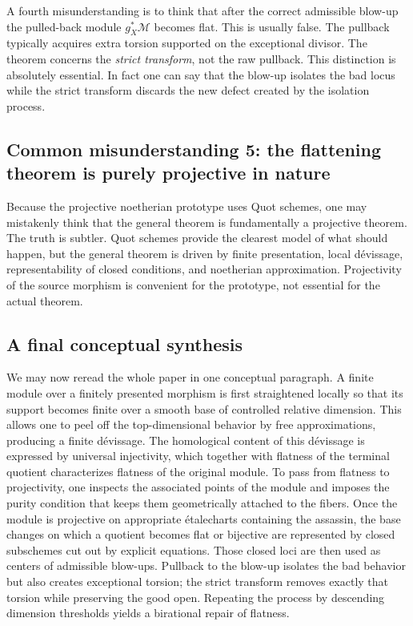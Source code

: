 \documentclass[11pt,oneside]{article}
\newcommand{\M}{\mathcal M}
\newcommand{\etale}{\'etale}
\begin{document}
A fourth misunderstanding is to think that after the correct admissible blow-up the pulled-back module $g_X^*\M$ becomes flat.  This is usually false.  The pullback typically acquires extra torsion supported on the exceptional divisor.  The theorem concerns the \emph{strict transform}, not the raw pullback.  This distinction is absolutely essential.  In fact one can say that the blow-up isolates the bad locus while the strict transform discards the new defect created by the isolation process.

\subsection*{Common misunderstanding 5: the flattening theorem is purely projective in nature}

Because the projective noetherian prototype uses Quot schemes, one may mistakenly think that the general theorem is fundamentally a projective theorem.  The truth is subtler.  Quot schemes provide the clearest model of what should happen, but the general theorem is driven by finite presentation, local d\'evissage, representability of closed conditions, and noetherian approximation.  Projectivity of the source morphism is convenient for the prototype, not essential for the actual theorem.

\subsection*{A final conceptual synthesis}

We may now reread the whole paper in one conceptual paragraph.  A finite module over a finitely presented morphism is first straightened locally so that its support becomes finite over a smooth base of controlled relative dimension.  This allows one to peel off the top-dimensional behavior by free approximations, producing a finite d\'evissage.  The homological content of this d\'evissage is expressed by universal injectivity, which together with flatness of the terminal quotient characterizes flatness of the original module.  To pass from flatness to projectivity, one inspects the associated points of the module and imposes the purity condition that keeps them geometrically attached to the fibers.  Once the module is projective on appropriate \etale charts containing the assassin, the base changes on which a quotient becomes flat or bijective are represented by closed subschemes cut out by explicit equations.  Those closed loci are then used as centers of admissible blow-ups.  Pullback to the blow-up isolates the bad behavior but also creates exceptional torsion; the strict transform removes exactly that torsion while preserving the good open.  Repeating the process by descending dimension thresholds yields a birational repair of flatness.
\end{document}
